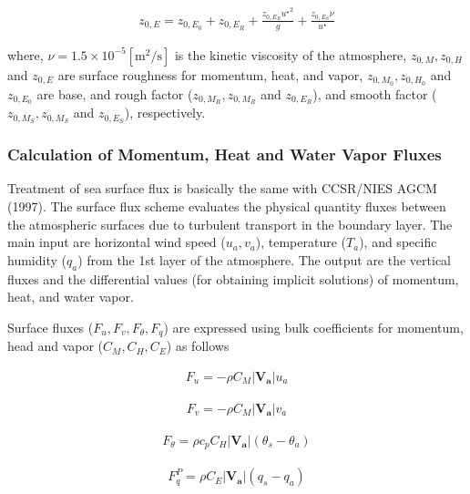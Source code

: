 \begin{eqnarray}
    z_{0,E} = z_{0,E_0} + z_{0,E_R} + \frac{z_{0,E_R} {u^\star }^2 }{g} + \frac{z_{0,E_S}\nu }{u^\star}
\end{eqnarray}

where, \(\nu = 1.5 \times 10^{-5} \mathrm{[m^2/s]}\) is the kinetic
viscosity of the atmosphere, \(z_{0,M},z_{0,H}\) and \(z_{0,E}\) are
surface roughness for momentum, heat, and vapor, \(z_{0,M_0},z_{0,H_0}\)
and \(z_{0,E_0}\) are base, and rough factor (\(z_{0,M_R},z_{0,M_R}\)
and \(z_{0,E_R}\)), and smooth factor (\(z_{0,M_S},z_{0,M_S}\) and
\(z_{0,E_S}\)), respectively.

\hypertarget{calculation-of-momentum-heat-and-water-vapor-fluxes}{%
\subsubsection{Calculation of Momentum, Heat and Water Vapor
Fluxes}\label{calculation-of-momentum-heat-and-water-vapor-fluxes}}

Treatment of sea surface flux is basically the same with CCSR/NIES AGCM
(1997). The surface flux scheme evaluates the physical quantity fluxes
between the atmospheric surfaces due to turbulent transport in the
boundary layer. The main input are horizontal wind speed (\(u_a, v_a\)),
temperature (\(T_a\)), and specific humidity (\(q_a\)) from the 1st
layer of the atmosphere. The output are the vertical fluxes and the
differential values (for obtaining implicit solutions) of momentum,
heat, and water vapor.

Surface fluxes (\(F_u, F_v, F_\theta, F_q\)) are expressed using bulk
coefficients for momentum, head and vapor (\(C_M, C_H, C_E\)) as follows

\begin{eqnarray}
    F_u  =  - \rho C_M |\mathbf{V_a}| u_a
\end{eqnarray}

\begin{eqnarray}
    F_v  =  - \rho C_M |\mathbf{V_a}| v_a
\end{eqnarray}

\begin{eqnarray}
    F_\theta  = \rho c_p C_H |\mathbf{V_a}| ( \theta_s - \theta_a )
\end{eqnarray}

\begin{eqnarray}
    F_q^P =  \rho C_E |\mathbf{V_a}| ( q_s - q_a )
\end{eqnarray}


